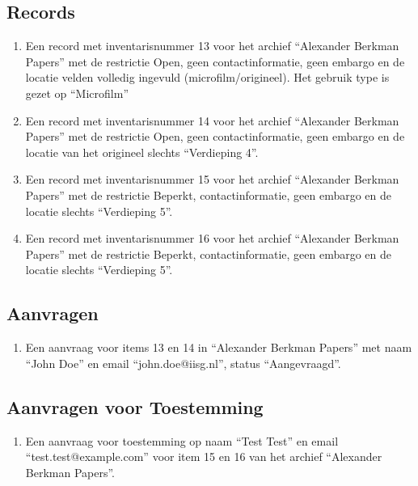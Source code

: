 \documentclass[a4paper,titlepage]{report}
\begin{document}
    \subsection{Records}
      \begin{enumerate}
        \item Een record met inventarisnummer 13 voor het archief ``Alexander Berkman Papers'' met de
        restrictie Open, geen contactinformatie, geen embargo en de locatie
        velden volledig ingevuld (microfilm/origineel). Het gebruik type is
        gezet op ``Microfilm''
        \item Een record met inventarisnummer 14 voor het archief ``Alexander Berkman Papers'' met de
        restrictie Open, geen contactinformatie, geen embargo en de locatie van
        het origineel slechts ``Verdieping 4''.
        \item Een record met inventarisnummer 15 voor het archief ``Alexander Berkman Papers'' met de
        restrictie Beperkt, contactinformatie, geen embargo en de locatie
        slechts ``Verdieping 5''.
        \item Een record met inventarisnummer 16 voor het archief ``Alexander Berkman Papers'' met de
        restrictie Beperkt, contactinformatie, geen embargo en de locatie
        slechts ``Verdieping 5''.
      \end{enumerate}
    \subsection{Aanvragen}
      \begin{enumerate}
        \item Een aanvraag voor items 13 en 14 in ``Alexander Berkman Papers'' met
          naam ``John Doe'' en email ``john.doe@iisg.nl'', status
          ``Aangevraagd''.
      \end{enumerate}
    \subsection{Aanvragen voor Toestemming}
      \begin{enumerate}
        \item Een aanvraag voor toestemming op naam ``Test Test'' en email
        ``test.test@example.com'' voor item 15 en 16 van het archief
        ``Alexander Berkman Papers''.
      \end{enumerate}
\end{document}

